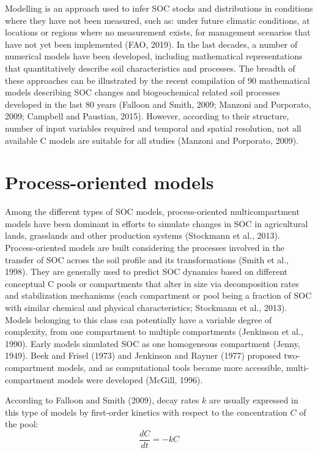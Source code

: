 \documentclass[
  10pt,
  b5paper,
]{book}
\begin{document}
Modelling is an approach used to infer SOC stocks and distributions in conditions where they have not been measured, such as: under future climatic conditions, at locations or regions where no measurement exists, for management scenarios that have not yet been implemented (FAO, 2019). In the last decades, a number of numerical models have been developed, including mathematical representations that quantitatively describe soil characteristics and processes. The breadth of these approaches can be illustrated by the recent compilation of 90 mathematical models describing SOC changes and biogeochemical related soil processes developed in the last 80 years (Falloon and Smith, 2009; Manzoni and Porporato, 2009; Campbell and Paustian, 2015). However, according to their structure, number of input variables required and temporal and spatial resolution, not all available C models are suitable for all studies (Manzoni and Porporato, 2009).

\hypertarget{process-oriented-models}{%
\section{Process-oriented models}\label{process-oriented-models}}

Among the different types of SOC models, process-oriented multicompartment models have been dominant in efforts to simulate changes in SOC in agricultural lands, grasslands and other production systems (Stockmann et al., 2013).
Process-oriented models are built considering the processes involved in the transfer of SOC across the soil profile and its transformations (Smith et al., 1998). They are generally used to predict SOC dynamics based on different conceptual C pools or compartments that alter in size via decomposition rates and stabilization mechanisms (each compartment or pool being a fraction of SOC with similar chemical and physical characteristics; Stockmann et al., 2013). Models belonging to this class can potentially have a variable degree of complexity, from one compartment to multiple compartments (Jenkinson et al., 1990). Early models simulated SOC as one homogeneous compartment (Jenny, 1949). Beek and Frisel (1973) and Jenkinson and Rayner (1977) proposed two-compartment models, and as computational tools became more accessible, multi-compartment models were developed (McGill, 1996).

According to Falloon and Smith (2009), decay rates \(k\) are usually expressed in this type of models by first-order kinetics with respect to the concentration \(C\) of the pool:\\
\begin{equation}
\tag{3.1}
\frac{dC}{dt} =- kC 	
\end{equation}
\end{document}
